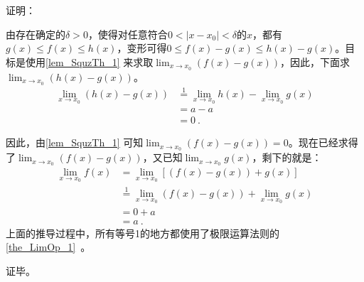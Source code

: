 证明：

由存在确定的$\delta>0$，使得对任意符合$0<|x-x_0|<\delta$的$x$，都有$g(x)\leq f(x)\leq h(x)$，变形可得$0\leq f(x)-g(x)\leq h(x)-g(x)$。目标是使用\autoref{lem_SquzTh_1} 来求取$\lim _{x\to x_0}(f(x)-g(x))$，因此，下面求$\lim _{x\to x_0}(h(x)-g(x))$。
$$
\begin{align*}
\lim _{x\to x_0}(h(x)-g(x))&\overset{\mathrm{1}}{=}\lim _{x\to x_0}h(x)-\lim _{x\to x_0}g(x)\\
&=a-a\\
&=0~.
\end{align*}
$$

因此，由\autoref{lem_SquzTh_1} 可知$\lim _{x\to x_0}(f(x)-g(x))=0$。现在已经求得了$\lim _{x\to x_0}(f(x)-g(x))$，又已知$\lim _{x\to x_0}g(x)$，剩下的就是：
$$
\begin{align*}
\lim _{x\to x_0}f(x) &= \lim _{x\to x_0}[(f(x)-g(x))+g(x)] \\ 
&\overset{\mathrm{1}}{=} \lim _{x\to x_0}(f(x)-g(x))+\lim _{x\to x_0}g(x)\\ 
&= 0+a\\ 
&=a~.\end{align*}
$$
上面的推导过程中，所有等号1的地方都使用了极限运算法则的\autoref{the_LimOp_1}~。

证毕。
